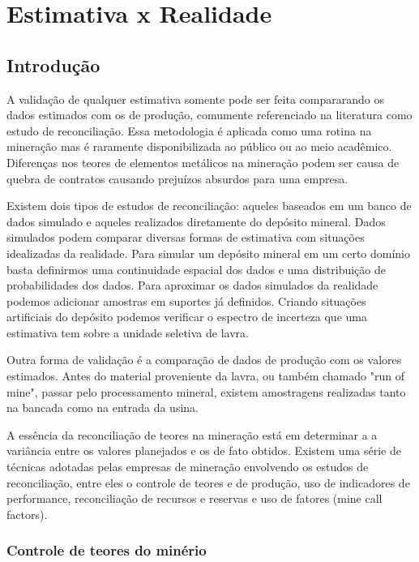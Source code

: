 \chapter{Estimativa x Realidade}

\section{Introdução}

A validação de qualquer estimativa somente pode ser feita compararando os dados estimados com os de produção, comumente referenciado na literatura como estudo de reconciliação. Essa metodologia é aplicada como uma rotina na mineração mas é raramente disponibilizada ao público ou ao meio acadêmico. Diferenças nos teores de elementos metálicos na mineração podem ser causa de quebra de contratos causando prejuízos absurdos para uma empresa.

 Existem dois tipos de estudos de reconciliação: aqueles baseados em um banco de dados simulado e aqueles realizados diretamente do depósito mineral. Dados simulados podem comparar diversas formas de estimativa com situações idealizadas da realidade. Para simular um depósito mineral em um certo domínio basta definirmos uma continuidade espacial dos dados e uma distribuição de probabilidades dos dados. Para aproximar os dados simulados da realidade podemos adicionar amostras em suportes já definidos. Criando situações artificiais do depósito podemos verificar o espectro de incerteza que uma estimativa tem sobre a unidade seletiva de lavra.
 
 Outra forma de validação é a comparação de dados de produção com os valores estimados. Antes do material proveniente da lavra, ou também chamado "run of mine", passar pelo processamento mineral, existem amostragens realizadas tanto na bancada como na entrada da usina. 
 
 A essência da reconciliação de teores na mineração está em determinar a a variância entre os valores planejados e os de fato obtidos. Existem uma série de técnicas adotadas pelas empresas de mineração envolvendo os estudos de reconciliação, entre eles o controle de teores e de produção, uso de indicadores de performance, reconciliação de recursos e reservas e uso de fatores (mine call factors). 
 
 \subsection{Controle de teores do minério}
 
